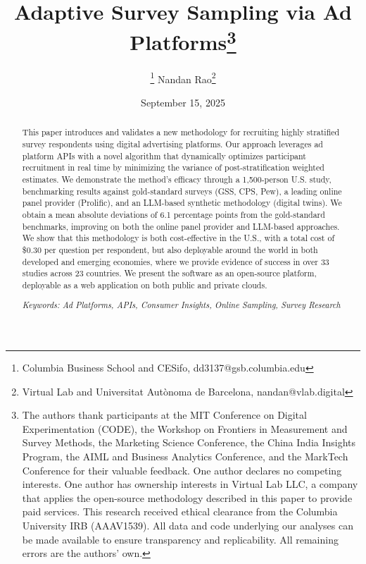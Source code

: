 \documentclass[letterpaper,12pt]{article}
\title{{\Huge Adaptive Survey Sampling  via Ad Platforms}\thanks{The authors thank participants at the MIT Conference on Digital Experimentation (CODE), the Workshop on Frontiers in Measurement and Survey Methods, the Marketing Science Conference, the China India Insights Program, the AIML and Business Analytics Conference, and the MarkTech Conference for their valuable feedback. One author declares no competing interests. One author  has ownership interests in Virtual Lab LLC, a company that applies the open-source methodology described in this paper to provide paid services. This research received ethical clearance from the Columbia University IRB (AAAV1539). All data and code underlying our analyses can be made available to ensure transparency and replicability. All remaining errors are the authors’ own.\vspace{1pt}}}
\theoremstyle{proposition}
\begin{document}
\author{\vspace*{1cm}{\Large Dante Donati}\thanks{Columbia Business School and CESifo, dd3137@gsb.columbia.edu} \hspace{50pt} {\Large  Nandan Rao}\thanks{Virtual Lab and Universitat Autònoma de Barcelona, nandan@vlab.digital}}

\date{September 15, 2025}
\maketitle
\singlespacing
\begin{abstract}
This paper introduces and validates a new methodology for recruiting highly stratified survey respondents using digital advertising platforms. Our approach leverages ad platform APIs with a novel algorithm that dynamically optimizes participant recruitment in real time by minimizing the variance of post-stratification weighted estimates. We demonstrate the method’s efficacy through a 1,500-person U.S. study, benchmarking results against gold-standard surveys (GSS, CPS, Pew), a leading online panel provider (Prolific), and an LLM-based synthetic methodology (digital twins). We obtain a mean absolute deviations of 6.1 percentage points from the gold-standard benchmarks, improving on both the online panel provider and LLM-based approaches. We show that this methodology is both cost-effective in the U.S., with a total cost of \$0.30 per question per respondent, but also deployable around the world in both developed and emerging economies, where we provide evidence of success in over 33 studies across 23 countries. We present the software as an open-source platform, deployable as a web application on both public and private clouds.






\vspace{0.3cm}
\noindent \textit{Keywords: Ad Platforms, APIs, Consumer Insights,  Online Sampling, Survey Research}


\end{abstract}
\end{document}
